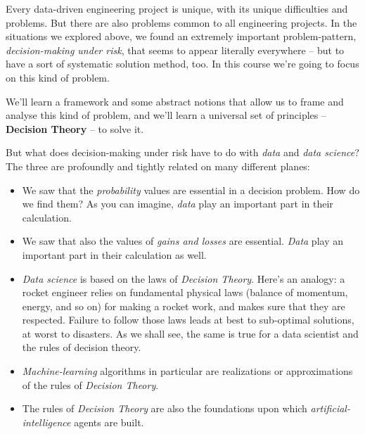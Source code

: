 \documentclass[
  a4paper,
  DIV=11,
  numbers=noendperiod,
  oneside]{scrreprt}
\begin{document}
Every data-driven engineering project is unique, with its unique
difficulties and problems. But there are also problems common to all
engineering projects. In the situations we explored above, we found an
extremely important problem-pattern, \emph{decision-making under risk},
that seems to appear literally everywhere -- but to have a sort of
systematic solution method, too. In this course we're going to focus on
this kind of problem.

We'll learn a framework and some abstract notions that allow us to frame
and analyse this kind of problem, and we'll learn a universal set of
principles -- {\textbf{Decision Theory}} -- to solve it.

But what does decision-making under risk have to do with \emph{data} and
\emph{data science}? The three are profoundly and tightly related on
many different planes:

\begin{tcolorbox}[enhanced jigsaw, titlerule=0mm, toprule=.15mm, toptitle=1mm, bottomrule=.15mm, leftrule=.75mm, title={}, arc=.35mm, breakable, left=2mm, coltitle=black, colframe=quarto-callout-tip-color-frame, colbacktitle=quarto-callout-tip-color!10!white, bottomtitle=1mm, rightrule=.15mm, opacitybacktitle=0.6, opacityback=0, colback=white]

\begin{itemize}
\item
  We saw that the \emph{probability} values are essential in a decision
  problem. How do we find them? As you can imagine, \emph{data} play an
  important part in their calculation.
\item
  We saw that also the values of \emph{gains and losses} are essential.
  \emph{Data} play an important part in their calculation as well.
\item
  \emph{Data science} is based on the laws of \emph{Decision Theory}.
  Here's an analogy: a rocket engineer relies on fundamental physical
  laws (balance of momentum, energy, and so on) for making a rocket
  work, and makes sure that they are respected. Failure to follow those
  laws leads at best to sub-optimal solutions, at worst to disasters. As
  we shall see, the same is true for a data scientist and the rules of
  decision theory.
\item
  \emph{Machine-learning} algorithms in particular are realizations or
  approximations of the rules of \emph{Decision Theory}.
\item
  The rules of \emph{Decision Theory} are also the foundations upon
  which \emph{artificial-intelligence} agents are built.
\end{itemize}

\end{tcolorbox}
\end{document}
